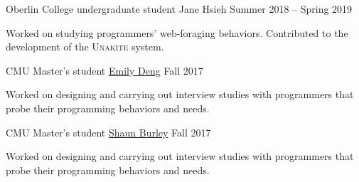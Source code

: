 
\begin{cventries}
  \cventry
    {Oberlin College undergraduate student} %
    {Jane Hsieh} %
    {Summer 2018 -- Spring 2019} %
    {} %
    {
      \begin{cvitems} %
        \item {Worked on studying programmers' web-foraging behaviors. Contributed to the development of the \textsc{Unakite} system.}
      \end{cvitems}
    }

  \cventry
    {CMU Master's student} %
    {\href{https://emilywdeng.com/}{Emily Deng}} %
    {Fall 2017} %
    {} %
    {
      \begin{cvitems} %
        \item {Worked on designing and carrying out interview studies with programmers that probe their programming behaviors and needs.}
      \end{cvitems}
    }

  \cventry
    {CMU Master's student} %
    {\href{http://www.shaunburley.com/}{Shaun Burley}} %
    {Fall 2017} %
    {} %
    {
      \begin{cvitems} %
        \item {Worked on designing and carrying out interview studies with programmers that probe their programming behaviors and needs.}
      \end{cvitems}
    }

\end{cventries}